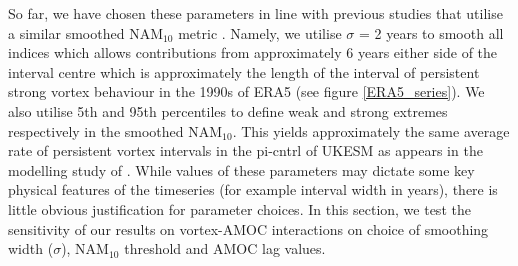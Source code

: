 So far, we have chosen these parameters in line with previous studies that utilise a similar smoothed NAM$_{10}$ metric \citep{reichlerStratospheric2012}. Namely, we utilise $\sigma$ = 2 years to smooth all indices which allows contributions from approximately 6 years either side of the interval centre which is approximately the length of the interval of persistent strong vortex behaviour in the 1990s of ERA5 (see figure \ref{ERA5_series}). We also utilise 5th and 95th percentiles to define weak and strong extremes respectively in the smoothed NAM$_{10}$. This yields approximately the same average rate of persistent vortex intervals in the pi-cntrl of UKESM as appears in the modelling study of \cite{reichlerStratospheric2012}. While values of these parameters may dictate some key physical features of the timeseries (for example interval width in years), there is little obvious justification for parameter choices. In this section, we test the sensitivity of our results on vortex-AMOC interactions on choice of smoothing width ($\sigma$), NAM$_{10}$ threshold and AMOC lag values. 

